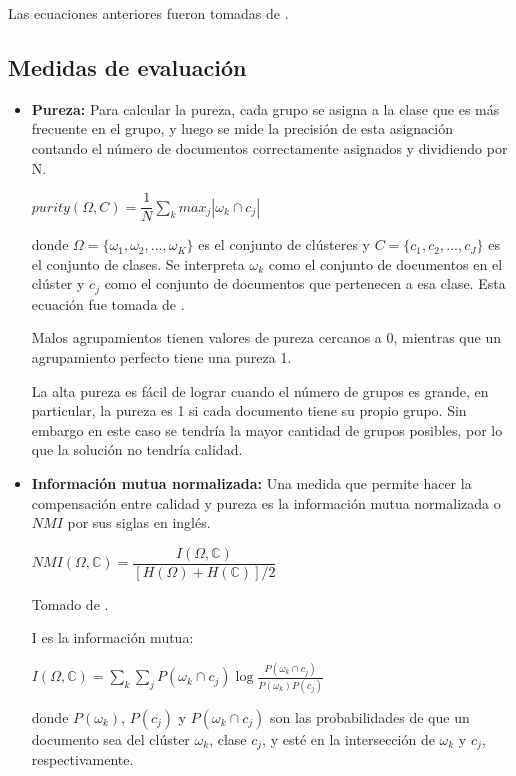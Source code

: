 \documentclass{llncs}
\begin{document}
Las ecuaciones anteriores fueron tomadas de \cite[Secci\'on 16.2.2, p.3]{B3}.

\subsection{Medidas de evaluaci\'on} 
	\normalsize
	\begin{itemize}
	\item \textbf{Pureza:} Para calcular la pureza, cada grupo se asigna a la clase que es más frecuente en el grupo, y luego se mide la precisión de esta asignación contando el número de documentos correctamente asignados y dividiendo por N.
	
	\begin{center}
		$purity(\Omega, C) = \dfrac{1}{N} \sum_{k}max_{j} |\omega_{k} \cap c_{j}| $ 
	\end{center}
	
	donde $ \Omega = \{\omega_{1}, \omega_{2}, ... , \omega_{K}\} $ es el conjunto de cl\'usteres y $ C = \{c_{1}, c_{2}, ... , c_{J}\} $ es el conjunto de clases. Se interpreta $ \omega_{k} $ como el conjunto de documentos en el cl\'uster y $ c_{j} $ como el conjunto de documentos que pertenecen a esa clase. Esta ecuaci\'on fue tomada de \cite[Ecuaci\'on 16.1, p.357]{B1}.
	
	Malos agrupamientos tienen valores de pureza cercanos a 0, mientras que un agrupamiento perfecto tiene una pureza 1.
	
	La alta pureza es fácil de lograr cuando el número de grupos es grande, en particular, la pureza es 1 si cada documento tiene su propio grupo. Sin embargo en este caso se tendr\'ia la mayor cantidad de grupos posibles, por lo que la soluci\'on no tendr\'ia calidad.
	
	\vspace{1em}
	\item \textbf{Información mutua normalizada:} Una medida que permite hacer la compensaci\'on entre calidad y pureza es la información mutua normalizada o $ NMI $ por sus siglas en ingl\'es.
	
	\begin{center}
		$ NMI(\Omega, \mathbb{C}) = \dfrac{I(\Omega, \mathbb{C})}{[H(\Omega) + H(\mathbb{C})]/2}
		$ 
	\end{center}
	
	Tomado de \cite[Ecuaci\'on 16.2, p.358]{B1}.
	
	I es la informaci\'on mutua:
	\begin{center}
		$ I(\Omega, \mathbb{C}) = \sum_{k}\sum_{j}P(\omega_{k} \cap c_{j})\log\frac{P(\omega_{k} \cap c_{j})}{P(\omega_{k})P(c_{j})} $
	\end{center}
	donde $ P(\omega_{k}) $, $ P(c_{j}) $ y $ P(\omega_{k} \cap c_{j}) $ son las probabilidades de que un documento sea del cl\'uster $ \omega_{k} $, clase $ c_{j} $, y est\'e en la intersección de $ \omega_{k} $ y $ c_{j} $, respectivamente.
	

\end{itemize}
\end{document}

